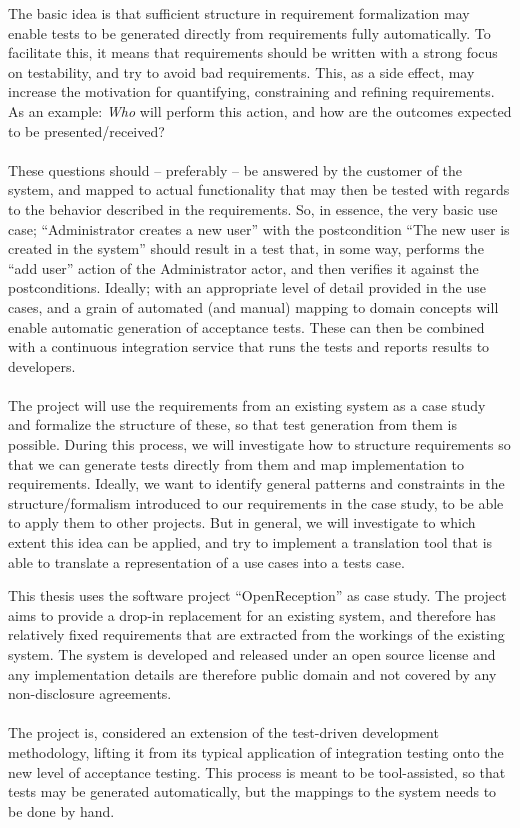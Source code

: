 
The basic idea is that sufficient structure in requirement formalization may enable tests to be generated directly from requirements fully automatically. To facilitate this, it means that requirements should be written with a strong focus on testability, and try to avoid bad requirements. This, as a side effect, may increase the motivation for quantifying, constraining and refining requirements. As an example: \emph{Who} will perform this action, and how are the outcomes expected to be presented/received?\\\\
These questions should -- preferably -- be answered by the customer of the system, and mapped to actual functionality that may then be tested with regards to the behavior described in the requirements. So, in essence, the very basic use case; ``Administrator creates a new user'' with the postcondition ``The new user is created in the system'' should result in a test that, in some way, performs the ``add user'' action of the Administrator actor, and then verifies it against the postconditions. Ideally; with an appropriate level of detail provided in the use cases, and a grain of automated (and manual) mapping to domain concepts will enable automatic generation of acceptance tests. These can then be combined with a continuous integration service that runs the tests and reports results to developers.\\\\
The project will use the requirements from an existing system as a case study and formalize the structure of these, so that test generation from them is possible. During this process, we will investigate how to structure requirements so that we can generate tests directly from them and map implementation to requirements. Ideally, we want to identify general patterns and constraints in the structure/formalism introduced to our requirements in the case study, to be able to apply them to other projects. But in general, we will investigate to which extent this idea can be applied, and try to implement a translation tool that is able to translate a representation of a use cases into a tests case.

This thesis uses the software project ``OpenReception'' as case study. The project aims to provide a drop-in replacement for an existing system, and therefore has relatively fixed requirements that are extracted from the workings of the existing system. The system is developed and released under an open source license and any implementation details are therefore public domain and not covered by any non-disclosure agreements. \\\\
The project is, considered an extension of the test-driven development methodology, lifting it from its typical application of integration testing onto the new level of acceptance testing. This process is meant to be tool-assisted, so that tests may be generated automatically, but the mappings to the system needs to be done by hand.

